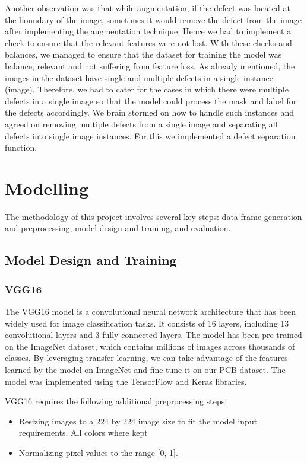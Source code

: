 \documentclass[12pt]{article}
\begin{document}
Another observation was that while augmentation, if the defect was located at the boundary of the image, sometimes it would remove the defect from the image after implementing the augmentation technique. Hence we had to implement a check to ensure that the relevant features were not lost. With these checks and balances, we managed to ensure that the dataset for training the model was balance, relevant and not suffering from feature loss.
As already mentioned, the images in the dataset have single and multiple defects in a single instance (image). Therefore, we had to cater for the cases in which there were multiple defects in a single image so that the model could process the mask and label for the defects accordingly. We brain stormed on how to handle such instances and agreed on removing multiple defects from a single image and separating all defects into single image instances. For this we implemented a defect separation function.

\clearpage
\newpage

\section{Modelling}
The methodology of this project involves several key steps: data frame generation and preprocessing, model design and training, and evaluation.


\subsection{Model Design and Training}

\subsubsection{VGG16}

The VGG16 model is a convolutional neural network architecture that has been widely used for image classification tasks. It consists of 16 layers, including 13 convolutional layers and 3 fully connected layers. The model has been pre-trained on the ImageNet dataset, which contains millions of images across thousands of classes. By leveraging transfer learning, we can take advantage of the features learned by the model on ImageNet and fine-tune it on our PCB dataset.
The model was implemented using the TensorFlow and Keras libraries. 

VGG16 requires the following additional preprocessing steps: 

\begin{itemize}
    \item Resizing images to a 224 by 224 image size to fit the model input requirements. All colors where kept
    \item Normalizing pixel values to the range [0, 1].  
\end{itemize}
\end{document}
